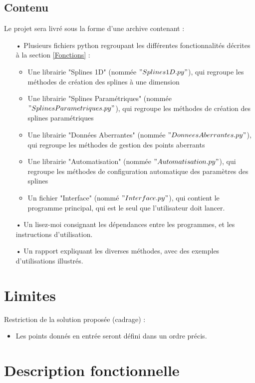 \documentclass[a4paper,12pt]{article}
\begin{document}
\subsection*{Contenu}
Le projet sera livré sous la forme d'une archive contenant :
\begin{itemize}
\item[•] Plusieurs fichiers python regroupant les différentes fonctionnalités décrites à la section \ref{Fonctions}  : 
\begin{itemize}
\item Une librairie "Splines 1D" (nommée $"Splines1D.py"$), qui regroupe les méthodes de création des splines à une dimension
\item Une librairie "Splines Paramétriques" (nommée $"SplinesParametriques.py"$), qui regroupe les méthodes de création des splines paramétriques
\item Une librairie "Données Aberrantes" (nommée $"DonneesAberrantes.py"$), qui regroupe les méthodes de gestion des points aberrants
\item Une librairie "Automatisation" (nommée $"Automatisation.py"$), qui regroupe les méthodes de configuration automatique des paramètres des splines
\item Un fichier "Interface" (nommé $"Interface.py"$), qui contient le programme principal, qui est le seul que l'utilisateur doit lancer.
\end{itemize}
\item[•] Un lisez-moi consignant les dépendances entre les programmes, et les instructions d'utilisation.
\item[•] Un rapport expliquant les diverses méthodes, avec des exemples d’utilisations illustrés.
\end{itemize}

\section{Limites}

Restriction de la solution proposée (cadrage) :
\begin{itemize}
\item Les points donnés en entrée seront défini dans un ordre précis.
\end{itemize}

\section{Description fonctionnelle}
\end{document}
